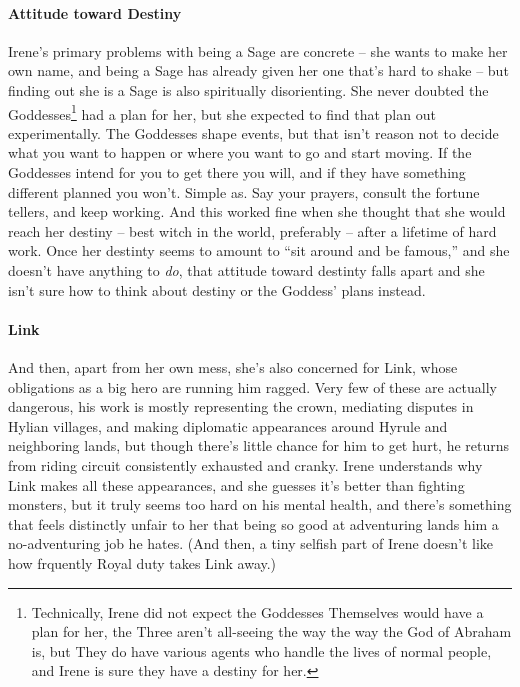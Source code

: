   \paragraph{Attitude toward Destiny} Irene's primary problems with being a Sage are concrete -- she wants to make her own name, and being a Sage has already given her one that's hard to shake -- but finding out she is a Sage is also spiritually disorienting. She never doubted the Goddesses\footnote{Technically, Irene did not expect the Goddesses Themselves would have a plan for her, the Three aren't all-seeing the way the way the God of Abraham is, but They do have various agents who handle the lives of normal people, and Irene is sure they have a destiny for her.} had a plan for her, but she expected to find that plan out experimentally. The Goddesses shape events, but that isn't reason not to decide what you want to happen or where you want to go and start moving. If the Goddesses intend for you to get there you will, and if they have something different planned you won't. Simple as. Say your prayers, consult the fortune tellers, and keep working. And this worked fine when she thought that she would reach her destiny -- best witch in the world, preferably -- after a lifetime of hard work. Once her destinty seems to amount to ``sit around and be famous,'' and she doesn't have anything to \emph{do}, that attitude toward destinty falls apart and she isn't sure how to think about destiny or the Goddess' plans instead.
  
  \paragraph{Link} And then, apart from her own mess, she's also concerned for Link, whose obligations as a big hero are running him ragged. Very few of these are actually dangerous, his work is mostly representing the crown, mediating disputes in Hylian villages, and making diplomatic appearances around Hyrule and neighboring lands, but though there's little chance for him to get hurt, he returns from riding circuit consistently exhausted and cranky. Irene understands why Link makes all these appearances, and she guesses it's better than fighting monsters, but it truly seems too hard on his mental health, and there's something that feels distinctly unfair to her that being so good at adventuring lands him a no-adventuring job he hates. (And then, a tiny selfish part of Irene doesn't like how frquently Royal duty takes Link away.)

